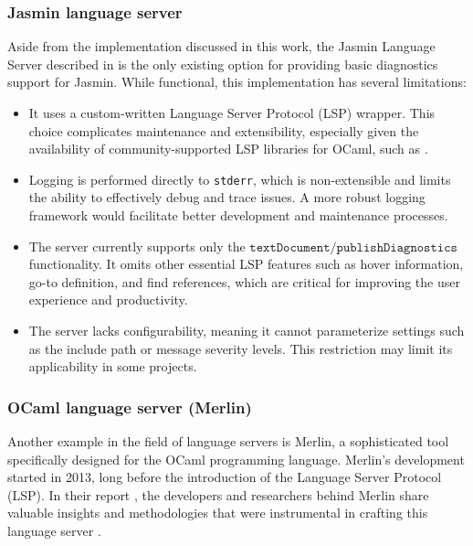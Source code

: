 \subsubsection*{Jasmin language server}

Aside from the implementation discussed in this work, the Jasmin Language Server
described in \cite{gh-jasmin-lsp} is the only existing option for providing
basic diagnostics support for Jasmin. While functional, this implementation has
several limitations:

\begin{itemize}
    \item It uses a custom-written Language Server Protocol (LSP) wrapper.
    This choice complicates maintenance and extensibility, especially given the
    availability of community-supported LSP libraries for OCaml, such as
    \cite{opam-ocaml-lsp}.
    
    \item Logging is performed directly to \texttt{stderr}, which is
    non-extensible and limits the ability to effectively debug and trace issues.
    A more robust logging framework would facilitate better development and
    maintenance processes.
    
    \item The server currently supports only the
    $\texttt{textDocument/publishDiagnostics}$ functionality. It omits other
    essential LSP features such as hover information, go-to definition, and find
    references, which are critical for improving the user experience and
    productivity.
    
    \item The server lacks configurability, meaning it cannot parameterize
    settings such as the include path or message severity levels. This
    restriction may limit its applicability in some projects.

\end{itemize}

\subsubsection*{OCaml language server (Merlin)}

Another example in the field of language servers is Merlin, a sophisticated tool
specifically designed for the OCaml programming language.  Merlin's development
started in 2013, long before the introduction of the Language Server Protocol
(LSP). In their report \cite{merlin:2018}, the developers and researchers behind
Merlin share valuable insights and methodologies that were instrumental in
crafting this language server \cite{gh-merlin}. 

